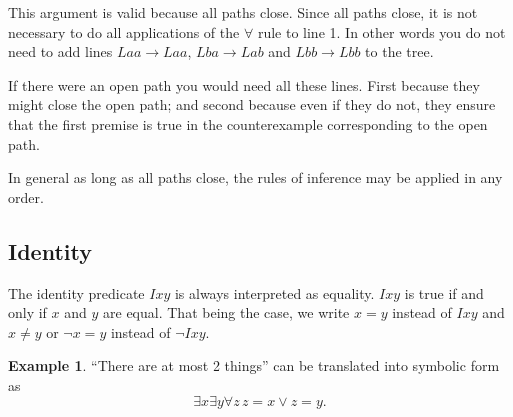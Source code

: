 \documentclass[letterpaper, 11pt]{article}
\theoremstyle{definition}
\newtheorem{example}[theorem]{Example}
\begin{document}
\begin{enumerate}

This argument is valid because all paths close. Since all paths close, it is not necessary to do all applications of the $\forall$ rule to line 1. In other words you do not need to add lines $Laa \to  Laa$, $Lba \to  Lab$ and $Lbb \to  Lbb$ to the tree.

If there were an open path you would need all these lines. First because they might close the open path; and second because even if they do not, they ensure that the first premise is true in the counterexample corresponding to the open path.  

In general as long as all paths close, the rules of inference may be applied in any order. 

\end{enumerate}

\subsection{Identity}

The identity predicate $Ixy$ is always interpreted as equality. $Ixy$ is true if and only if $x$ and $y$ are equal. That being the case, we write $x=y$ instead of $Ixy$ and $x\neq y$ or $\neg x=y$ instead of $\neg Ixy$.

\begin{example} ``There are at most 2 things'' can be translated into symbolic form as
\[\exists x \exists y \forall z\, z=x \vee z=y.\]
\end{example}
\end{document}
